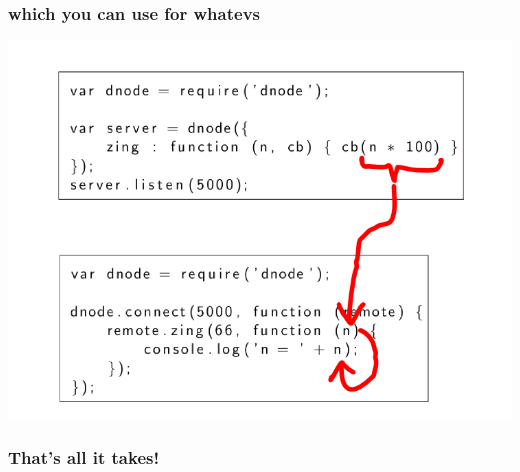 \documentclass{beamer}
\begin{document}
\begin{frame}
\frametitle{which you can use for whatevs}
\includegraphics[scale=0.6]{images/zing_flow_6.png}
\end{frame}

\begin{frame}
\begin{center}
\huge
\frametitle{That's all it takes!}

\normalsize
\fbox{
    
}
\end{center}
\end{frame}

\begin{frame}

\end{frame}


\end{document}
